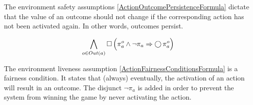 

The environment safety assumptions \eqref{ActionOutcomePersistenceFormula} dictate that the value of an outcome should not change if the corresponding action has not been activated again. 
In other words, outcomes persist.

\begin{equation}\label{ActionOutcomePersistenceFormula}
	\bigwedge \limits_{o \in Out(a)} \operatorname{\Box} \Big( \pi_a^o \wedge \lnot \pi_a \Rightarrow \operatorname{\bigcirc} \pi_a^o \Big)
\end{equation}

The environment liveness assumption \eqref{ActionFairnessConditionsFormula} is a fairness condition.
It states that (always) eventually, the activation of an action will result in an outcome.
The disjunct $\lnot \pi_a$ is added in order to prevent the system from winning the game by never activating the action.


